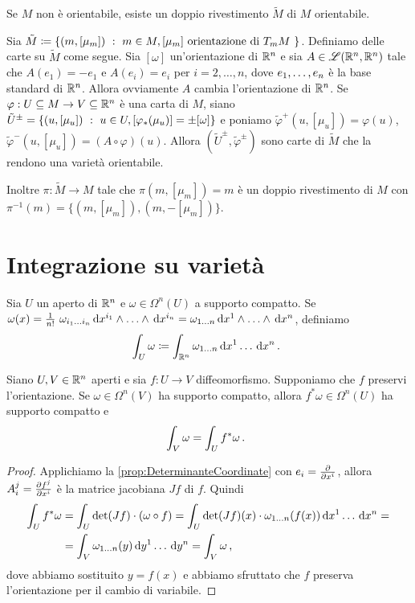 \begin{remark}
	Se $M$ non è orientabile, esiste un doppio rivestimento $\tilde M$ di $M$ orientabile.
	
	Sia $\tilde M \coloneqq \{ (m,[\mu_m]) \suchthat m\in M, \text{$[\mu_m]$ orientazione di $T_mM$ } \}$. Definiamo delle carte su $\tilde M$ come segue. Sia $[\omega]$ un'orientazione di $\R^n$ e sia $A\in\Lin(\R^n,\R^n)$ tale che $A(e_1) = -e_1$ e $A(e_i) = e_i$ per $i=2,\ldots,n$, dove $\seqb en,$ è la base standard di $\R^n$. Allora ovviamente $A$ cambia l'orientazione di $\R^n$.
	Se $\varphi:U\subseteq M \to V\subseteq \R^n$ è una carta di $M$, siano $\tilde U^\pm = \{ (u,[\mu_u]) \suchthat u \in U, [\varphi_*(\mu_u)] = \pm[\omega] \}$ e poniamo $\tilde\varphi^+(u,[\mu_u]) = \varphi(u)$, $\tilde\varphi^-(u,[\mu_u]) = (A\circ\varphi)(u)$.
	Allora $(\tilde U^\pm,\tilde\varphi^\pm)$ sono carte di $\tilde M$ che la rendono una varietà orientabile.
	
	Inoltre $\pi:\tilde M\to M$ tale che $\pi(m, [\mu_m]) = m$ è un doppio rivestimento di $M$ con $\pi^{-1}(m) = \{ (m,[\mu_m] ), (m,-[\mu_m]) \}$.
\end{remark}


\section{Integrazione su varietà}

\begin{definition}
	Sia $U$ un aperto di $\R^n$ e $\omega\in\Omega^n(U)$ a supporto compatto. Se $\omega(x) = \frac 1{n!}\ \omega_{\seqb in{}} \de x^{i_1}\wedge \ldots \wedge \de x^{i_n} = \omega_{1\ldots n} \seqa{\de x}n\wedge$, definiamo
	\begin{equation*}
		\int_U \omega \coloneqq \int_{\R^n} \omega_{1 \ldots n} \seqa {\de x}n{} \punto 
	\end{equation*}
\end{definition}

\begin{proposition} \label{prop:CambioVariabileRn}
	Siano $U,V\in\R^n$ aperti e sia $f:U\to V$ diffeomorfismo. Supponiamo che $f$ preservi l'orientazione. Se $\omega \in \Omega^n(V)$ ha supporto compatto, allora $f^*\omega \in \Omega^n(U)$ ha supporto compatto e 
	\begin{equation*}
		\int_V \omega = \int_U f^*\omega \punto
	\end{equation*}
\end{proposition}
\begin{proof}
	Applichiamo la \cref{prop:DeterminanteCoordinate} con $e_i= \DerParz{}{x^i}$, allora $A_i^j = \DerParz{f^j}{x^i}$ è la matrice jacobiana $Jf$ di $f$. Quindi
	\begin{align*}
		\int_U f^*\omega &= \int_U \det (Jf) \cdot (\omega\circ f) = \int_U \det (Jf)(x)\cdot \omega_{1\ldots n}(f(x)) \seqa {\de x}n{} =\\
		&= \int_V \omega_{1\ldots n}(y) \seqa {\de y}n{} = \int_V \omega \virgola
	\end{align*}
	dove abbiamo sostituito $y=f(x)$ e abbiamo sfruttato che $f$ preserva l'orientazione per il cambio di variabile.
\end{proof}

